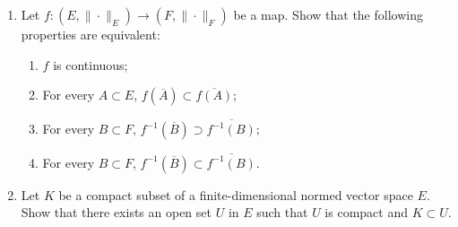 \documentclass[12pt]{article}
\begin{document}
\section{}
\begin{enumerate}
    \item[(1)] Let \( f : (E, \|\cdot\|_E) \to (F, \|\cdot\|_F) \) be a map. Show that the following properties are equivalent:
    \begin{enumerate}
        \item[(a)] \( f \) is continuous;
        \item[(b)] For every \( A \subset E \), \( f(\overline{A}) \subset \overline{f(A)} \);
        \item[(c)] For every \( B \subset F \), \( f^{-1}(\overline{B}) \supset \overline{f^{-1}(B)} \);
        \item[(d)] For every \( B \subset F \), \( f^{-1}(\overline{B}) \subset \overline{f^{-1}(B)} \).
    \end{enumerate}
    \item[(2)] Let \( K \) be a compact subset of a finite-dimensional normed vector space \( E \). Show that there exists an open set \( U \) in \( E \) such that \( U \) is compact and \( K \subset U \).
\end{enumerate}
\end{document}
